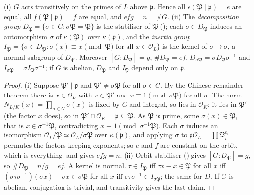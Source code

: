 \begin{proposition}\label{prop:ant:galoissplitting}
(i) $G$ acts transitively on the primes of $L$ above $\mathfrak p$. Hence all $e(\mathfrak P\mid\mathfrak p)=e$ are equal, all
$f(\mathfrak P\mid\mathfrak p)=f$ are equal, and $efg=n=\#G$.
(ii) The \emph{decomposition group} $D_{\mathfrak P}=\{\sigma\in G:\sigma\mathfrak P=\mathfrak P\}$ is the stabiliser of $\mathfrak P$ (); each
$\sigma\in D_{\mathfrak P}$ induces an automorphism $\bar\sigma$ of $\kappa(\mathfrak P)$ over $\kappa(\mathfrak p)$, and the \emph{inertia group}
$I_{\mathfrak P}=\{\sigma\in D_{\mathfrak P}:\sigma(x)\equiv x\pmod{\mathfrak P}\text{ for all }x\in\mathcal O_L\}$ is the kernel of $\sigma\mapsto\bar\sigma$, a
normal subgroup of $D_{\mathfrak P}$. Moreover $[G:D_{\mathfrak P}]=g$, $\#D_{\mathfrak P}=ef$, $D_{\sigma\mathfrak P}=\sigma D_{\mathfrak P}\sigma^{-1}$ and
$I_{\sigma\mathfrak P}=\sigma I_{\mathfrak P}\sigma^{-1}$; if $G$ is abelian, $D_{\mathfrak P}$ and $I_{\mathfrak P}$ depend only on $\mathfrak p$.
\end{proposition}

\begin{proof}
(i) Suppose $\mathfrak P'\mid\mathfrak p$ and $\mathfrak P'\ne\sigma\mathfrak P$ for all $\sigma\in G$. By the Chinese remainder theorem there is $x\in\mathcal O_L$
with $x\in\mathfrak P'$ and $x\equiv1\pmod{\sigma\mathfrak P}$ for all $\sigma$. The norm $N_{L/K}(x)=\prod_{\sigma\in G}\sigma(x)$ is fixed by $G$ and integral,
so lies in $\mathcal O_K$; it lies in $\mathfrak P'$ (the factor $x$ does), so in $\mathfrak P'\cap\mathcal O_K=\mathfrak p\subseteq\mathfrak P$. As $\mathfrak P$ is
prime, some $\sigma(x)\in\mathfrak P$, that is $x\in\sigma^{-1}\mathfrak P$, contradicting $x\equiv1\pmod{\sigma^{-1}\mathfrak P}$. Each $\sigma$ induces
an isomorphism $\mathcal O_L/\mathfrak P\simeq\mathcal O_L/\sigma\mathfrak P$ over $\kappa(\mathfrak p)$, and applying $\sigma$ to
$\mathfrak p\mathcal O_L=\prod\mathfrak P_i^{e_i}$ permutes the factors keeping exponents; so $e$ and $f$ are constant on the orbit, which is everything, and
 gives $efg=n$. (ii) Orbit-stabiliser () gives $[G:D_{\mathfrak P}]=g$, so $\#D_{\mathfrak P}=n/g=ef$. A kernel is normal.
$\tau\in I_{\mathfrak P}$ iff $\tau x-x\in\mathfrak P$ for all $x$ iff $(\sigma\tau\sigma^{-1})(\sigma x)-\sigma x\in\sigma\mathfrak P$ for all $x$ iff
$\sigma\tau\sigma^{-1}\in I_{\sigma\mathfrak P}$; the same for $D$. If $G$ is abelian, conjugation is trivial, and transitivity gives the last claim.
\end{proof}


